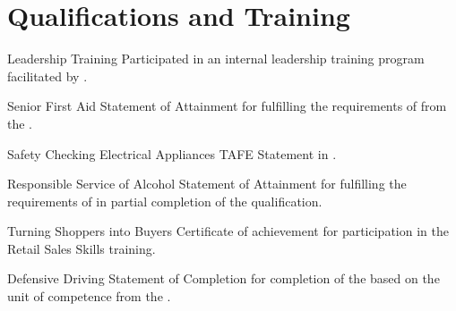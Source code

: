 \documentclass[10pt]{article}
\begin{document}
\section*{Qualifications and Training}
\begin{qualifications}

{Leadership Training}
{Participated in an internal leadership training program facilitated by 
.}

{Senior First Aid}
{Statement of Attainment for fulfilling the requirements of 
 from the 
.}

{Safety Checking Electrical Appliances}
{TAFE Statement in .}

{Responsible Service of Alcohol}
{Statement of Attainment for fulfilling the requirements of 
 in 
partial completion of the  qualification.}

{Turning Shoppers into Buyers}
{Certificate of achievement for participation in the  
 Retail Sales Skills training.}

{Defensive Driving}
{Statement of Completion for completion of the  based on the unit of competence 
 from the 
.}

\end{qualifications}

\end{document}
